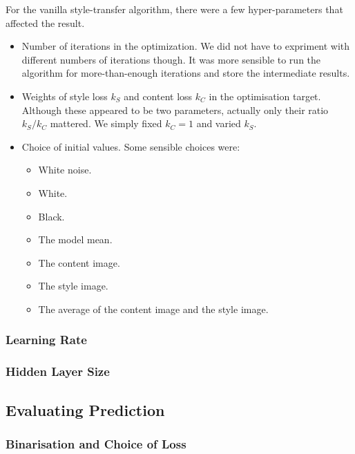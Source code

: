 \documentclass[runningheads]{llncs}
\begin{document}
For the vanilla style-transfer algorithm, there were a few hyper-parameters that 
affected the result.
\begin{itemize}
\item Number of iterations in the optimization. 
We did not have to expriment with different numbers of iterations though.
It was more sensible to run the algorithm for more-than-enough iterations and store the intermediate results.
\item Weights of style loss $k_S$ and content loss $k_C$ in the optimisation target. 
Although these appeared to be two parameters,
actually only their ratio $k_S/k_C$ mattered.
We simply fixed $k_C=1$ and varied $k_S$.
\item Choice of initial values. Some sensible choices were:
\begin{itemize}
\item White noise.
\item White.
\item Black.
\item The model mean.
\item The content image.
\item The style image.
\item The average of the content image and the style image.
\end{itemize}
\end{itemize}


\subsubsection{Learning Rate}

\subsubsection{Hidden Layer Size}

\subsection{Evaluating Prediction}

\subsubsection{Binarisation and Choice of Loss}
\end{document}
